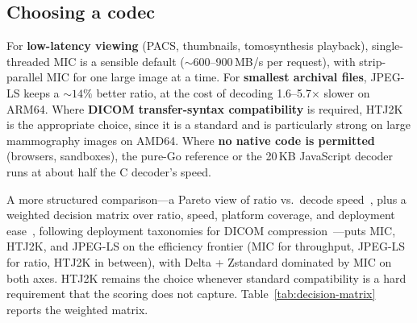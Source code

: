 \documentclass[journal]{IEEEtran}
\begin{document}
\subsection{Choosing a codec}

For \textbf{low-latency viewing} (PACS, thumbnails, tomosynthesis playback),
single-threaded MIC is a sensible default (${\sim}600$--900\,MB/s per request),
with strip-parallel MIC for one large image at a time. For \textbf{smallest
archival files}, JPEG-LS keeps a ${\sim}14\%$ better ratio, at the cost of
decoding 1.6--5.7$\times$ slower on ARM64. Where \textbf{DICOM transfer-syntax
compatibility} is required, HTJ2K is the appropriate choice, since it is a
standard and is particularly strong on large mammography images on AMD64. Where
\textbf{no native code is permitted} (browsers, sandboxes), the pure-Go
reference or the 20\,KB JavaScript decoder runs at about half the C decoder's
speed.

A more structured comparison---a Pareto view of ratio vs.\ decode
speed~\cite{geldreich_pareto,jpegxl_pareto}, plus a weighted decision matrix
over ratio, speed, platform coverage, and deployment
ease~\cite{saaty_ahp,sayood}, following deployment taxonomies for DICOM
compression~\cite{clunie_miit2009,liu2017}---puts MIC, HTJ2K, and JPEG-LS on
the efficiency frontier (MIC for throughput, JPEG-LS for ratio, HTJ2K in
between), with Delta + Zstandard dominated by MIC on both axes. HTJ2K remains
the choice whenever standard compatibility is a hard requirement that the
scoring does not capture.
Table~\ref{tab:decision-matrix} reports the weighted matrix.
\end{document}
